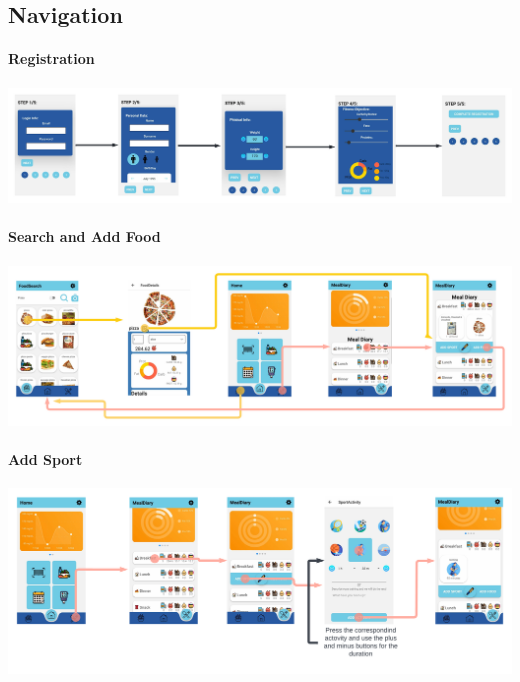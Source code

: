 \documentclass[12pt,hidelinks]{article}
\begin{document}
\subsection{Navigation}

\paragraph{Registration}

\begin{center}
	\includegraphics[scale=0.085]{Registration}
\end{center}

\paragraph{Search and Add Food}

\begin{center}
	\includegraphics[scale=0.108]{Search Food}
\end{center}

\paragraph{Add Sport}
\begin{center}
	\includegraphics[scale=0.117]{Sport}
\end{center}
\end{document}
